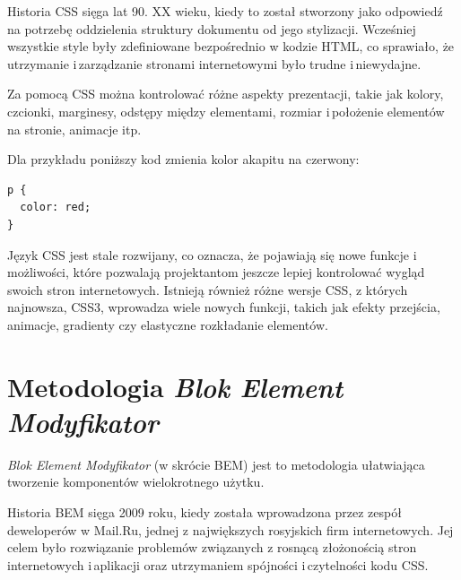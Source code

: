 \documentclass[a4paper,12pt]{book} %
\begin{document}
Historia CSS sięga lat 90. XX wieku, kiedy to został stworzony jako odpowiedź na potrzebę oddzielenia struktury dokumentu od jego stylizacji. Wcześniej wszystkie style były zdefiniowane bezpośrednio w kodzie HTML, co sprawiało, że utrzymanie i\,zarządzanie stronami internetowymi było trudne i\,niewydajne.

Za pomocą CSS można kontrolować różne aspekty prezentacji, takie jak kolory, czcionki, marginesy, odstępy między elementami, rozmiar i\,położenie elementów na stronie, animacje itp.


Dla przykładu poniższy kod zmienia kolor akapitu na czerwony:
\begin{lstlisting}
p {
  color: red;
}
\end{lstlisting}

Język CSS jest stale rozwijany, co oznacza, że pojawiają się nowe funkcje i\,możliwości, które pozwalają projektantom jeszcze lepiej kontrolować wygląd swoich stron internetowych. Istnieją również różne wersje CSS, z których najnowsza, CSS3, wprowadza wiele nowych funkcji, takich jak efekty przejścia, animacje, gradienty czy elastyczne rozkładanie elementów.

\section{Metodologia \emph{Blok Element Modyfikator}}
\emph{Blok Element Modyfikator} (w skrócie BEM) jest to metodologia ułatwiająca tworzenie komponentów wielokrotnego użytku.

Historia BEM sięga 2009 roku, kiedy została wprowadzona przez zespół deweloperów w Mail.Ru, jednej z największych rosyjskich firm internetowych. Jej celem było rozwiązanie problemów związanych z rosnącą złożonością stron internetowych i\,aplikacji oraz utrzymaniem spójności i\,czytelności kodu CSS.
\end{document}
